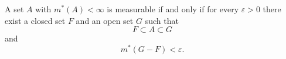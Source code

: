 \begin{lemma}[Lemma 3.11]
A set $A$ with $m^*(A) < \infty$ is measurable if and only if for every $\varepsilon > 0$ there exist a closed set $F$ and an open set $G$ such that
$$
F \subset A \subset G
$$
and
$$
m^*(G - F) < \varepsilon.
$$
\end{lemma}
